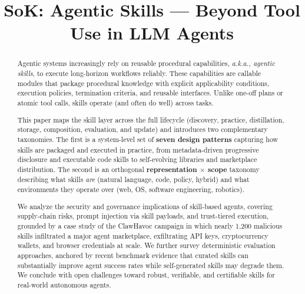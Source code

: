 \documentclass[conference, compsoc]{IEEEtran}
\theoremstyle{plain}
\begin{document}
\title{SoK: Agentic Skills — Beyond Tool Use in LLM Agents}

\author{
}
\maketitle

\begin{abstract}
Agentic systems increasingly rely on reusable procedural capabilities, \textit{a.k.a., agentic skills},  to execute long-horizon workflows reliably. These capabilities are callable modules that package procedural knowledge with explicit applicability conditions, execution policies, termination criteria, and reusable interfaces. Unlike one-off plans or atomic tool calls, skills operate (and often do well) across tasks.


This paper maps the skill layer across the full lifecycle (discovery, practice, distillation, storage, composition, evaluation, and update) and introduces two complementary taxonomies. The first is a system-level set of \textbf{seven design patterns} capturing how skills are packaged and executed in practice, from metadata-driven progressive disclosure and executable code skills to self-evolving libraries and marketplace distribution. The second is an orthogonal \textbf{representation $\times$ scope} taxonomy describing what skills \emph{are} (natural language, code, policy, hybrid) and what environments they operate over (web, OS, software engineering, robotics). 

We analyze the security and governance implications of skill-based agents, covering supply-chain risks, prompt injection via skill payloads, and trust-tiered execution, grounded by a case study of the ClawHavoc campaign in which nearly 1{,}200 malicious skills infiltrated a major agent marketplace, exfiltrating API keys, cryptocurrency wallets, and browser credentials at scale. We further survey deterministic evaluation approaches, anchored by recent benchmark evidence that curated skills can substantially improve agent success rates while self-generated skills may degrade them. We conclude with open challenges toward robust, verifiable, and certifiable skills for real-world autonomous agents.


\end{abstract}
\end{document}
